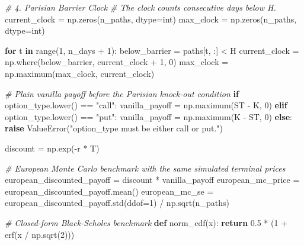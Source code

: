 \documentclass[
  11pt,
]{article}
\newenvironment{Shaded}{}{}
\newcommand{\BuiltInTok}[1]{\textcolor[rgb]{0.00,0.50,0.00}{#1}}
\newcommand{\CommentTok}[1]{\textcolor[rgb]{0.38,0.63,0.69}{\textit{#1}}}
\newcommand{\ControlFlowTok}[1]{\textcolor[rgb]{0.00,0.44,0.13}{\textbf{#1}}}
\newcommand{\DecValTok}[1]{\textcolor[rgb]{0.25,0.63,0.44}{#1}}
\newcommand{\FloatTok}[1]{\textcolor[rgb]{0.25,0.63,0.44}{#1}}
\newcommand{\KeywordTok}[1]{\textcolor[rgb]{0.00,0.44,0.13}{\textbf{#1}}}
\newcommand{\NormalTok}[1]{#1}
\newcommand{\OperatorTok}[1]{\textcolor[rgb]{0.40,0.40,0.40}{#1}}
\newcommand{\PreprocessorTok}[1]{\textcolor[rgb]{0.74,0.48,0.00}{#1}}
\newcommand{\StringTok}[1]{\textcolor[rgb]{0.25,0.44,0.63}{#1}}
\begin{document}
\begin{Shaded}
\begin{Highlighting}[]
\CommentTok{\# 4. Parisian Barrier Clock}
\CommentTok{\# The clock counts consecutive days below H.}
\NormalTok{current\_clock }\OperatorTok{=}\NormalTok{ np.zeros(n\_paths, dtype}\OperatorTok{=}\BuiltInTok{int}\NormalTok{)}
\NormalTok{max\_clock }\OperatorTok{=}\NormalTok{ np.zeros(n\_paths, dtype}\OperatorTok{=}\BuiltInTok{int}\NormalTok{)}

\ControlFlowTok{for}\NormalTok{ t }\KeywordTok{in} \BuiltInTok{range}\NormalTok{(}\DecValTok{1}\NormalTok{, n\_days }\OperatorTok{+} \DecValTok{1}\NormalTok{):}
\NormalTok{    below\_barrier }\OperatorTok{=}\NormalTok{ paths[t, :] }\OperatorTok{\textless{}}\NormalTok{ H}
\NormalTok{    current\_clock }\OperatorTok{=}\NormalTok{ np.where(below\_barrier, current\_clock }\OperatorTok{+} \DecValTok{1}\NormalTok{, }\DecValTok{0}\NormalTok{)}
\NormalTok{    max\_clock }\OperatorTok{=}\NormalTok{ np.maximum(max\_clock, current\_clock)}

\CommentTok{\# Plain vanilla payoff before the Parisian knock{-}out condition}
\ControlFlowTok{if}\NormalTok{ option\_type.lower() }\OperatorTok{==} \StringTok{"call"}\NormalTok{:}
\NormalTok{    vanilla\_payoff }\OperatorTok{=}\NormalTok{ np.maximum(ST }\OperatorTok{{-}}\NormalTok{ K, }\DecValTok{0}\NormalTok{)}
\ControlFlowTok{elif}\NormalTok{ option\_type.lower() }\OperatorTok{==} \StringTok{"put"}\NormalTok{:}
\NormalTok{    vanilla\_payoff }\OperatorTok{=}\NormalTok{ np.maximum(K }\OperatorTok{{-}}\NormalTok{ ST, }\DecValTok{0}\NormalTok{)}
\ControlFlowTok{else}\NormalTok{:}
    \ControlFlowTok{raise} \PreprocessorTok{ValueError}\NormalTok{(}\StringTok{"option\_type must be either \textquotesingle{}call\textquotesingle{} or \textquotesingle{}put\textquotesingle{}."}\NormalTok{)}

\NormalTok{discount }\OperatorTok{=}\NormalTok{ np.exp(}\OperatorTok{{-}}\NormalTok{r }\OperatorTok{*}\NormalTok{ T)}

\CommentTok{\# European Monte Carlo benchmark with the same simulated terminal prices}
\NormalTok{european\_discounted\_payoff }\OperatorTok{=}\NormalTok{ discount }\OperatorTok{*}\NormalTok{ vanilla\_payoff}
\NormalTok{european\_mc\_price }\OperatorTok{=}\NormalTok{ european\_discounted\_payoff.mean()}
\NormalTok{european\_mc\_se }\OperatorTok{=}\NormalTok{ european\_discounted\_payoff.std(ddof}\OperatorTok{=}\DecValTok{1}\NormalTok{) }\OperatorTok{/}\NormalTok{ np.sqrt(n\_paths)}

\CommentTok{\# Closed{-}form Black{-}Scholes benchmark}
\KeywordTok{def}\NormalTok{ norm\_cdf(x):}
    \ControlFlowTok{return} \FloatTok{0.5} \OperatorTok{*}\NormalTok{ (}\DecValTok{1} \OperatorTok{+}\NormalTok{ erf(x }\OperatorTok{/}\NormalTok{ np.sqrt(}\DecValTok{2}\NormalTok{)))}


\end{Highlighting}
\end{Shaded}
\end{document}
